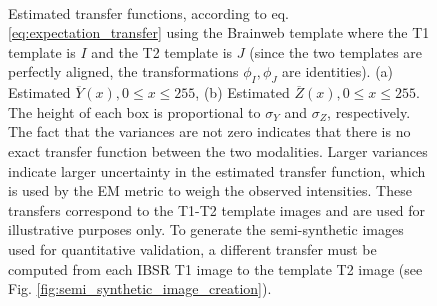 \begin{figure}[t!]
\centering
    \\
    \caption{Estimated transfer functions, according to eq. \eqref{eq:expectation_transfer} using the Brainweb template where the T1 template is $I$ and the T2 template is $J$
    (since the two templates are perfectly aligned, the transformations $\phi_{I}, \phi_{J}$ are identities). (a) Estimated $\overline{Y}(x), 0\leq x \leq 255$, (b) Estimated $\overline{Z}(x), 0\leq x \leq 255$. The height of each box is proportional to $\sigma_{Y}$ and $\sigma_{Z}$, respectively. The fact that the variances are not zero indicates that there is no exact transfer function between the two modalities. Larger variances indicate larger uncertainty in the estimated transfer function, which is used by the EM metric to weigh the observed intensities. These transfers correspond to the T1-T2 template images and are used for illustrative purposes only. To generate the semi-synthetic images used for quantitative validation, a different transfer must be computed from each IBSR T1 image to the template T2 image (see Fig. \ref{fig:semi_synthetic_image_creation}).}
\label{fig:transfers}
\end{figure}



